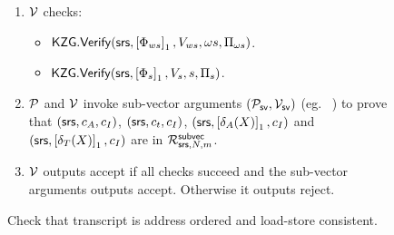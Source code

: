 \begin{figure}[htbp]
\begin{mdframed}
{\begin{enumerate}[leftmargin=1em, label=\arabic*]
\begin{itemize}[label=-]
                \item $[\Phi_{s}(X)]_1= c_A +r_2 [\delta_A(X)]_1 + r_2^2 c_t +r_2^3 [\delta_T(X)]_1 +r_2^4 c_{\op} +r_2^5 c_V +r_2^6 [Q_1(X)]_1 +r_2^7 [Q_2(X)]_1 +r_2^8 [Z_1(X)]_1 + r_2^9 [Z_2(X)]_1 $.
                \item $V_{ws}= \val{\omega s}{A}+r_1 \val{\omega s}{t}+ r_1^2 \val{\omega s}{V}$.
                \item $V_s=\val{s}{A}+r_2 \val{s}{\delta_A}+r_2^2 \val{s}{t}+r_2^3 \val{s}{\delta_T}+r_2^4 \val{s}{\op}
                +r_2^5 \val{s}{V} +r_2^6 \val{s}{Q_1} +r_2^7 \val{s}{Q_2}+r_2^8 \val{s}{Z_1} +r_2^9 \val{s}{Z_2}$.
            \end{itemize}
            \item $\mathcal{V}$ checks:
            \begin{itemize}[label=-]
                \item $\mathsf{KZG.Verify}(\mathsf{srs}, \left[{\Phi_{ws}}\right]_1, V_{ws}, \omega s, \Pi_{\omega s})$.
                \item $\mathsf{KZG.Verify}(\mathsf{srs}, \left[{\Phi_{s}}\right]_1, V_{s}, s, \Pi_{s})$.
            \end{itemize}

            \item $\mathcal{P}$ and $\mathcal{V}$ invoke sub-vector arguments $(\mathcal{P}_{\mathsf{sv}},\mathcal{V}_{\mathsf{sv}})$ (eg. ~\cite{EPRINT:EagFioGab22})
            to prove that $(\mathsf{srs},c_A,c_I)$, $(\mathsf{srs},c_t,c_I)$, $(\mathsf{srs},\left[{\delta_A(X)}\right]_1,c_I)$ and $(\mathsf{srs},\left[{\delta_T(X)}\right]_1,c_I)$
            are in $\mathcal{R}^{\mathsf{subvec}}_{\mathsf{srs},N,m}$.

            \item $\mathcal{V}$ outputs accept if all checks succeed and the sub-vector arguments outputs accept. Otherwise it outputs reject.
        \end{enumerate}
    }
    \end{mdframed}

    \caption{Check that transcript is address ordered and load-store consistent.}
    \label{fig:encoded-relations}
\end{figure}

